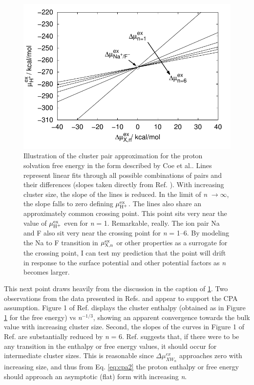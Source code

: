 \begin{cpa}
\begin{figure}
 \begin{center}
  \includegraphics[width=0.98\linewidth]{images/cpa/cpa_example.pdf}
 \end{center}
\caption[Illustration of the cluster pair approximation for the proton solvation free energy]{Illustration of the cluster pair approximation for the
proton solvation free energy in the form described by Coe et al.\cite{coe1998cpa1}. Lines represent linear fits through all possible combinations of 
pairs and their differences (slopes taken directly from Ref. \cite{coe1998cpa1}). With increasing cluster size, the slope of the lines is reduced.
In the limit of \emph{n} $\rightarrow \infty$, the slope falls to zero defining $\mu^{\mathrm{ex}}_{\mathrm{H^{\mathrm{+}}}}$. The lines also share an approximately 
common crossing point. This point sits very near the value of $\mu^{\mathrm{ex}}_{\mathrm{H^{+}}}$ even for \emph{n} = 1. Remarkable, really. The ion pair 
Na\sur{+} and F\sur{-} also sit very near the crossing point for \emph{n} = 1--6. By modeling the Na\sur{+} to F\sur{-} transition in 
$\mu^{\mathrm{ex}}_{\mathrm{X,n}}$ or other properties as a surrogate for the crossing point, I can test my prediction that the point will drift in response 
to the surface potential and other potential factors as \emph{n} becomes larger.}
\label{fig:coecpaexample}
\end{figure}

  This next point draws heavily from the discussion in the caption of \ref{fig:coecpaexample}. Two observations from the data presented in Refs. 
  \cite{coe1998cpa1} and \cite{kelly2006cpa} appear to support the CPA assumption. Figure 1 of Ref. \cite{coe1998cpa1} displays the cluster enthalpy 
  (obtained as in Figure \ref{fig:coecpaexample} for the free energy) vs \emph{n}$^{-1/3}$, showing an apparent convergence towards the bulk value with 
  increasing cluster size. Second, the slopes of the curves in Figure 1 of Ref. \cite{coe1998cpa1,kelly2006cpa,donald2010expand_cpa} are substantially 
  reduced by \emph{n} = 6. Ref. \cite{coe1998cpa1} suggests that, if there were to be any transition in the enthalpy or free energy values, it should occur 
  for intermediate cluster sizes. This is reasonable since $\Delta \mu^{ex}_{XW_n}$ approaches zero with increasing size, and thus from Eq. \ref{eq:cpa2}
  the proton enthalpy or free energy should approach an asymptotic (flat) form with increasing \emph{n}.


\end{cpa}
